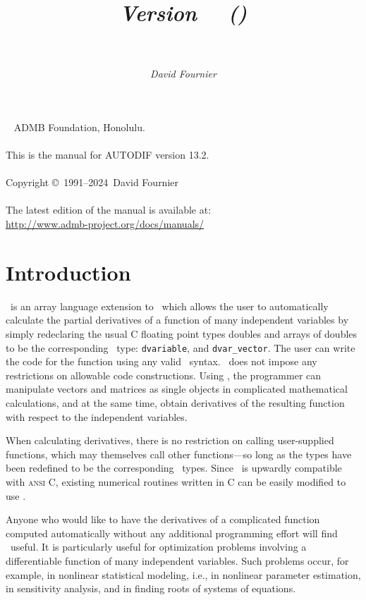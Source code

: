 \documentclass{admbmanual}
\title{%
  \largetitlepart{AUTODIF}
  \smalltitlepart{%
    A \cplus\ Array Language Extension\\
    with Automatic Differentiation\\
    for Use in Nonlinear Modeling and Statistics}
  \vspace{4ex}\textsf{\textit{Version \admbversion~~(\admbdate)\\[3pt]
      ~%
    }}\vspace{3ex}
}
\author{\textsf{\textit{David Fournier}}}
\newcommand\admbversion{13.2}
\newcommand\admbyear{2024}
\newcommand{\question}[1]{\bigskip\noindent{\bf #1?}\par\medskip\noindent}
\begin{document}
\maketitle

~\vfill
\noindent ADMB Foundation, Honolulu.\\\\
\noindent This is the manual for AUTODIF version \admbversion.\\\\
\noindent Copyright \copyright\ 1991--\admbyear\ David Fournier\\\\
\noindent The latest edition of the manual is available at:\\
\url{http://www.admb-project.org/docs/manuals/}

\tableofcontents

\chapter{Introduction}
\label{ch:introduction}

\question{What is \scAD}
\scAD\ is an array language extension to \cplus\ which allows the user to
automatically calculate the partial derivatives of a function of many
independent variables by simply redeclaring the usual C floating point types
doubles and arrays of doubles to be the corresponding \scAD\ type:
\texttt{dvariable}, and \texttt{dvar\_vector}. The user can write the code for
the function using any valid \cplus\ syntax. \scAD\ does not impose any
restrictions on allowable code constructions. Using \scAD, the programmer can
manipulate vectors and matrices as single objects in complicated mathematical
calculations, and at the same time, obtain derivatives of the resulting function
with respect to the independent variables.

When calculating derivatives, there is no restriction on calling user-supplied
functions, which may themselves call other functions---so long as the types have
been redefined to be the corresponding \scAD\ types. Since \cplus\ is upwardly
compatible with \textsc{ansi C}, existing numerical routines written in C can be
easily modified to use \scAD.

\question{Who should use \scAD}
Anyone who would like to have the derivatives of a complicated function computed
automatically without any additional programming effort will find \scAD\ useful.
It is particularly useful for optimization problems involving a differentiable
function of many independent variables. Such problems occur, for example, in
nonlinear statistical modeling, i.e., in nonlinear parameter estimation, in
sensitivity analysis, and in finding roots of systems of equations.
\end{document}
